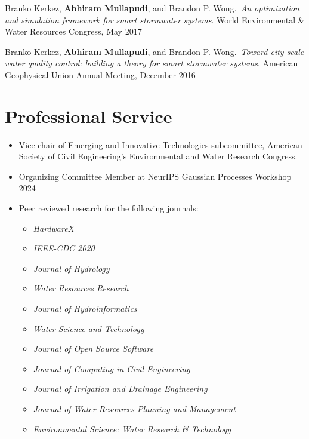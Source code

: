 \documentclass[a4paper,11pt]{article}
\newcommand{\years}[1]{%
  {\reversemarginpar\strut\marginnote{{\small#1}}}%
}
\begin{document}
\years{2017} Branko Kerkez, \textbf{Abhiram Mullapudi}, and Brandon P. Wong.\ \emph{An optimization and simulation framework for smart stormwater systems}. World Environmental \& Water Resources Congress, May 2017\\[.1cm]

\years{2016} Branko Kerkez, \textbf{Abhiram Mullapudi}, and Brandon P. Wong.\ \emph{Toward city-scale water quality control: building a theory for smart stormwater systems}. American Geophysical Union Annual Meeting, December 2016

\section*{Professional Service}

\begin{itemize}
	\item Vice-chair of Emerging and Innovative Technologies subcommittee, American Society of Civil Engineering's Environmental and Water Research Congress. 
	\item Organizing Committee Member at NeurIPS Gaussian Processes Workshop 2024
	\item Peer reviewed research for the following journals:
	\begin{itemize}
		\item \textit{HardwareX}
		\item \textit{IEEE-CDC 2020}
		\item \textit{Journal of Hydrology}
		\item \textit{Water Resources Research}
		\item \textit{Journal of Hydroinformatics}
		\item \textit{Water Science and Technology}
		\item \textit{Journal of Open Source Software}
		\item \textit{Journal of Computing in Civil Engineering}
		\item \textit{Journal of Irrigation and Drainage Engineering}
		\item \textit{Journal of Water Resources Planning and Management}
		\item \textit{Environmental Science: Water Research \& Technology}
	\end{itemize}
\end{itemize}
\end{document}
